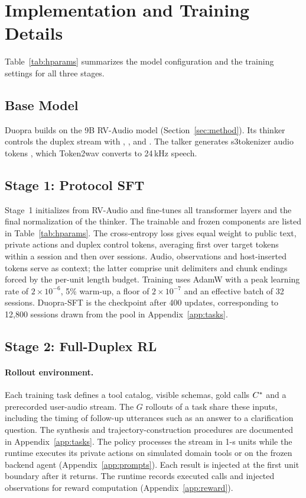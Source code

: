 \FloatBarrier
\section{Implementation and Training Details}
\label{app:impl}


Table~\ref{tab:hparams} summarizes the model configuration and the training settings for all three stages.

\subsection{Base Model}
Duopra builds on the 9B RV-Audio model (Section~\ref{sec:method}).
Its thinker controls the duplex stream with , ,  and .
The talker generates s3tokenizer audio tokens \citep[CosyVoice~2;][]{du2024cosyvoice2}, which Token2wav \citep[Step-Audio~2;][]{wu2025stepaudio2,stepfun2025stepaudio2code} converts to 24\,kHz speech.

\subsection{Stage 1: Protocol SFT}
Stage~1 initializes from RV-Audio and fine-tunes all transformer layers and the final normalization of the thinker.
The trainable and frozen components are listed in Table~\ref{tab:hparams}.
The cross-entropy loss gives equal weight to public text, private actions and duplex control tokens, averaging first over target tokens within a session and then over sessions.
Audio, observations and host-inserted tokens serve as context; the latter comprise unit delimiters and chunk endings forced by the per-unit length budget.
Training uses AdamW \citep{loshchilov2019adamw} with a peak learning rate of $2\times10^{-6}$, 5\% warm-up, a floor of $2\times10^{-7}$ and an effective batch of 32 sessions.
Duopra-SFT is the checkpoint after 400 updates, corresponding to 12,800 sessions drawn from the pool in Appendix~\ref{app:tasks}.

\subsection{Stage 2: Full-Duplex RL}

\paragraph{Rollout environment.}
Each training task defines a tool catalog, visible schemas, gold calls $C^{\ast}$ and a prerecorded user-audio stream.
The $G$ rollouts of a task share these inputs, including the timing of follow-up utterances such as an answer to a clarification question. The synthesis and trajectory-construction procedures are documented
in Appendix~\ref{app:tasks}.
The policy processes the stream in 1-s units while the runtime executes its private actions on simulated domain tools or on the frozen backend agent (Appendix~\ref{app:prompts}).
Each result is injected at the first unit boundary after it returns.
The runtime records executed calls and injected observations for reward computation (Appendix~\ref{app:reward}).

